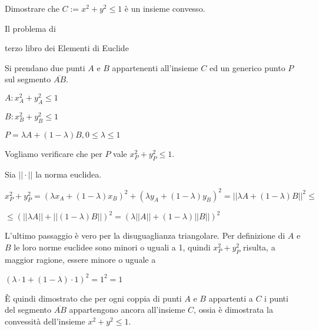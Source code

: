 \documentclass{article}
\begin{document}
Dimostrare che $C := x^2 + y^2 \leq 1$ \`e un insieme convesso.

\vspace{1cm}
\begin{figure}[h]
\centering
{}
\end{figure}
\vspace{1cm}

Il problema di

terzo libro dei Elementi di Euclide

Si prendano due punti $A$ e $B$ appartenenti all'insieme $C$ ed un generico punto $P$ sul segmento $\overline{AB}$.

$A : x_A^2 + y_A^2 \leq 1$

$B : x_B^2 + y_B^2 \leq 1$ 

$P = \lambda A + (1-\lambda) B, 0\leq\lambda\leq 1$

Vogliamo verificare che per $P$ vale $x_P^2 + y_P^2 \leq 1$.

Sia $||\cdot||$ la norma euclidea.

$x_P^2 + y_P^2 = \left(\lambda x_A + (1-\lambda) x_B\right)^2 + \left(\lambda y_A + (1-\lambda) y_B\right)^2 =|| \lambda A + (1-\lambda) B ||^2 \leq $

$\leq \left(||\lambda A|| + ||(1 - \lambda) B||\right)^2 = \left(\lambda ||A|| + (1-\lambda) ||B||\right)^2$

L'ultimo passaggio \`e vero per la disuguaglianza triangolare. Per definizione di $A$ e $B$ le loro norme euclidee sono minori o uguali a 1, quindi $x_P^2 + y_P^2$ risulta, a maggior ragione, essere minore o uguale a

$\left( \lambda\cdot 1 + (1 - \lambda) \cdot 1 \right)^2 = 1^2 = 1$

\`E quindi dimostrato che per ogni coppia di punti $A$ e $B$ appartenti a $C$ i punti del segmento $\overline{AB}$ appartengono ancora all'insieme $C$, ossia  \`e dimostrata la convessit\`a dell'insieme  $x^2 + y^2 \leq 1$.
\end{document}
